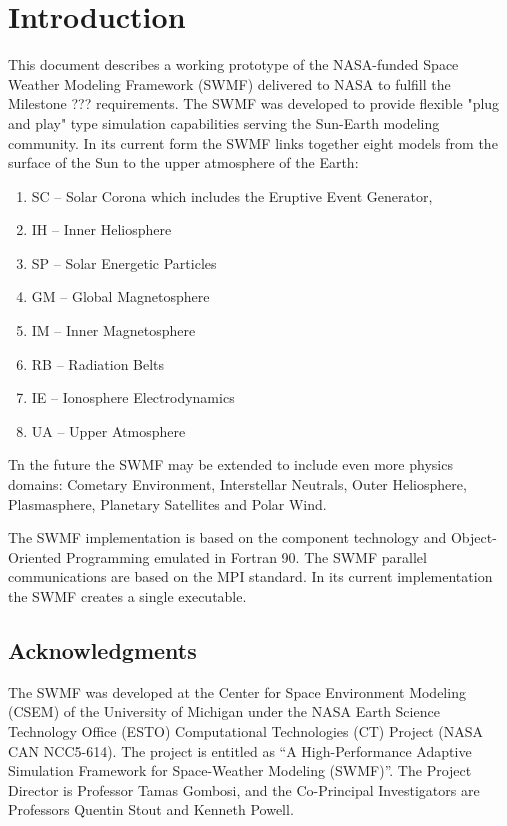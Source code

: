 


\chapter{Introduction}

This document describes a working prototype of the NASA-funded Space
Weather Modeling Framework (SWMF) delivered to NASA to fulfill the
Milestone ??? requirements. The SWMF was developed to provide flexible
"plug and play" type simulation capabilities serving the Sun-Earth
modeling community.  In its current form the SWMF links together eight
models from the surface of the Sun to the upper atmosphere of the Earth: 
\begin{enumerate}
\item SC -- Solar Corona which includes the Eruptive Event Generator,
\item IH -- Inner Heliosphere
\item SP -- Solar Energetic Particles 
\item GM -- Global Magnetosphere 
\item IM -- Inner Magnetosphere
\item RB -- Radiation Belts
\item IE -- Ionosphere Electrodynamics
\item UA -- Upper Atmosphere
\end{enumerate}
Tn the future the SWMF may be extended to include even more 
physics domains: Cometary Environment, Interstellar
Neutrals, Outer Heliosphere, Plasmasphere, Planetary Satellites and
Polar Wind. 

The SWMF implementation is based on the component technology and
Object-Oriented Programming emulated in Fortran 90.  The SWMF parallel
communications are based on the MPI standard.  In its current
implementation the SWMF creates a single executable.

\section{Acknowledgments}

The SWMF was developed at the Center for Space Environment Modeling
(CSEM) of the University of Michigan under the NASA Earth Science
Technology Office (ESTO) Computational Technologies (CT) Project (NASA
CAN NCC5-614). The project is entitled as ``A High-Performance
Adaptive Simulation Framework for Space-Weather Modeling (SWMF)''.
The Project Director is Professor Tamas Gombosi, and the Co-Principal
Investigators are Professors Quentin Stout and Kenneth Powell.

